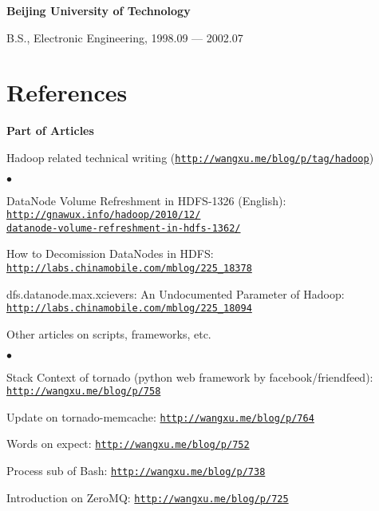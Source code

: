 \documentclass[a4paper,margin,line]{res}
\newenvironment{list1}{
  \begin{list}{\ding{113}}{%
      \setlength{\itemsep}{0in}
      \setlength{\parsep}{0in} \setlength{\parskip}{0in}
      \setlength{\topsep}{0in} \setlength{\partopsep}{0in} 
      \setlength{\leftmargin}{0.17in}}}{\end{list}}
\newenvironment{list2}{
  \begin{list}{$\bullet$}{%
      \setlength{\itemsep}{0in}
      \setlength{\parsep}{0in} \setlength{\parskip}{0in}
      \setlength{\topsep}{0in} \setlength{\partopsep}{0in} 
      \setlength{\leftmargin}{0.2in}}}{\end{list}}
\newcommand{\http}{http:/\hspace{-0.3ex}/}
\newcommand{\hindent}{\mbox{\hspace{8ex}}}
\begin{document}
\begin{resume}
{\bf Beijing University of Technology}\\
\vspace*{-.1in}
\begin{list1}
\item[] B.S., Electronic Engineering, 1998.09 --- 2002.07
\end{list1}

\section{\sc References}
\textbf{Part of Articles}\\
\vspace*{-.1in}
\begin{list1}
\item[] Hadoop related technical writing (\href{http://wangxu.me/blog/p/tag/hadoop}{\tt\http{}wangxu.me/blog/p/tag/hadoop})
\begin{list2}
\vspace*{.05in}
\item DataNode Volume Refreshment in HDFS-1326 (English):\\ 
    \hindent\href{http://gnawux.info/hadoop/2010/12/datanode-volume-refreshment-in-hdfs-1362/}{\tt\http{}gnawux.info/hadoop/2010/12/\\ \hindent\hindent{}datanode-volume-refreshment-in-hdfs-1362/}
\item How to Decomission DataNodes in HDFS: \\
	\hindent\href{http://labs.chinamobile.com/mblog/225_18378}{\tt\http{}labs.chinamobile.com/mblog/225\_18378}
\item dfs.datanode.max.xcievers: An Undocumented Parameter of Hadoop: \\
	\hindent\href{http://labs.chinamobile.com/mblog/225_18094}{\tt\http{}labs.chinamobile.com/mblog/225\_18094}
\vspace*{.05in}
\end{list2}
\item[] Other articles on scripts, frameworks, etc.
\begin{list2}
\vspace*{.05in}
\item Stack Context of tornado (python web framework by facebook/friendfeed):\\
  \hindent\href{http://wangxu.me/blog/p/758}{\tt\http{}wangxu.me/blog/p/758}
\item Update on tornado-memcache: \href{http://wangxu.me/blog/p/764}{\tt\http{}wangxu.me/blog/p/764}
\item Words on expect: \href{http://wangxu.me/blog/p/752}{\tt\http{}wangxu.me/blog/p/752}
\item Process sub of Bash: \href{http://wangxu.me/blog/p/738}{\tt\http{}wangxu.me/blog/p/738}
\item Introduction on ZeroMQ: \href{http://wangxu.me/blog/p/725}{\tt\http{}wangxu.me/blog/p/725}
\vspace*{.05in}
\end{list2}
\end{list1}


\end{resume}
\end{document}
